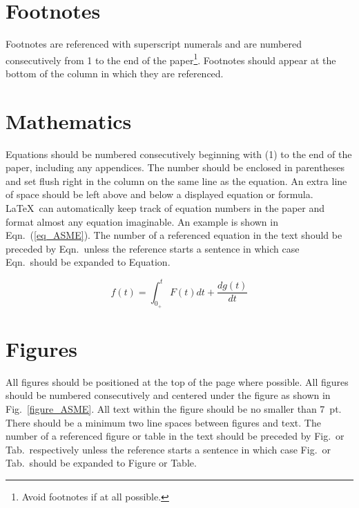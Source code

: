\documentclass[12pt]{asme2ej}
\begin{document}


    \section{Footnotes\protect\footnotemark}

    Footnotes are referenced with superscript numerals and are numbered consecutively from 1 to the end of the paper\footnote{Avoid footnotes if at all possible.}. Footnotes should appear at the bottom of the column in which they are referenced.




    \section{Mathematics}

    Equations should be numbered consecutively beginning with (1) to the end of the paper, including any appendices. The number should be enclosed in parentheses and set flush right in the column on the same line as the equation. An extra line of space should be left above and below a displayed equation or formula. \LaTeX\ can automatically keep track of equation numbers in the paper and format almost any equation imaginable. An example is shown in Eqn.~(\ref{eq_ASME}). The number of a referenced equation in the text should be preceded by Eqn.\ unless the reference starts a sentence in which case Eqn.\ should be expanded to Equation.

    \begin{equation}
        f(t) = \int_{0_+}^t F(t) dt + \frac{d g(t)}{d t}
        \label{eq_ASME}
    \end{equation}



    \section{Figures}
    \label{sect_figure}

    All figures should be positioned at the top of the page where possible. All figures should be numbered consecutively and centered under the figure as shown in Fig.~\ref{figure_ASME}. All text within the figure should be no smaller than 7~pt. There should be a minimum two line spaces between figures and text. The number of a referenced figure or table in the text should be preceded by Fig.\ or Tab.\ respectively unless the reference starts a sentence in which case Fig.\ or Tab.\ should be expanded to Figure or Table.
\end{document}
